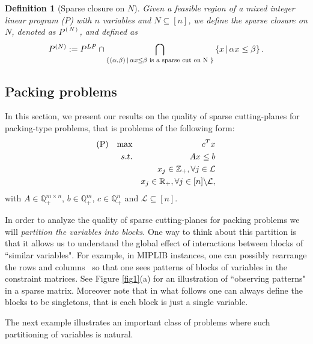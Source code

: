 \documentclass[smallextended]{svjour3}
\newtheorem{definition}[proposition]{Definition}
\begin{document}
\begin{definition}[Sparse closure on $N$]\label{defn:sparseclosure}
Given a feasible region of a mixed integer linear program ($P$) with $n$ variables and $N \subseteq [n]$, we define the {sparse closure on $N$}, denoted as $P^{(N)}$, and defined as
$$P^{(N)} :=  P^{LP} \cap \bigcap_{\left\{(\alpha, \beta)\,|\, \alpha x
\leq \beta \textup{ is a sparse cut on N } \right \} } \left\{x\,|\, \alpha x \leq \beta  \right\}.$$
\end{definition}

\subsection{Packing problems}\label{results:packing}
In this section, we present our results on the quality of sparse cutting-planes for packing-type problems, that is problems of the following form:
\begin{eqnarray}
\textup{(P)}~~~\textup{max}&& c^Tx \notag \\
s.t. &&Ax \leq b \notag \\
&&x_j \in \mathbb{Z}_+, \forall j \in \mathcal{L}  \notag \\
&&x_j \in \mathbb{R}_+, \forall j \in [n]\backslash \mathcal{L}, \notag
\end{eqnarray}
with $A \in \mathbb{Q}_{+}^{m \times n}$, $b\in \mathbb{Q}_+^m$, $c \in \mathbb{Q}_+^{n}$ and $\mathcal{L} \subseteq [n]$.

In order to analyze the quality of sparse cutting-planes for packing problems we will \emph{partition the variables into blocks}. One way to think about this partition is that it allows us to understand the {global} effect of interactions between blocks of ``similar variables". For example, in MIPLIB instances, one can possibly rearrange the rows and columns~\cite{BorndorferFM98,BergnerIPCO11,WangR13,AcerKA13} so that one sees patterns of blocks of variables in the constraint matrices.  See Figure \ref{fig1}(a) for an illustration of ``observing patterns" in a sparse matrix. Moreover note that in what follows one can always define the blocks to be singletons, that is each block is just a single variable. 

The next example illustrates an important class of problems where such partitioning of variables is natural. 
\end{document}
